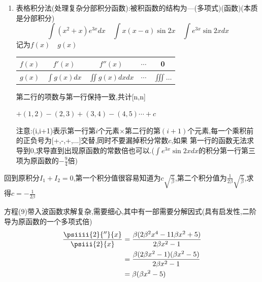 \begin{formal}
\begin{enumerate}
\begin{proof}
                \end{proof}

            \item 表格积分法(处理复杂分部积分函数):被积函数的结构为---(多项式)(函数)\quad(本质是分部积分)
                $$ \int(x^{2}+x) e^{3x} dx \quad \int x(x-a)\sin{2x} \quad \int e^{3x}\sin{2x}dx $$
                记为$f(x) \quad g(x)$

              
                \begin{center}

                    \begin{tabular}{|c|c|c|c|c|}
                        
                        \hline
                        $f(x)$ & $f'(x)$        & $f''(x)$          & $\cdots$ & 0 \\
                        \hline
                        $g(x)$ & $\int g(x) dx$ & $\iint g(x) dxdx$ & $\cdots$ & $\iiint \dots$ \\
                        \hline
                        
                    \end{tabular}
                    
                \end{center}
                
                第二行的项数与第一行保持一致,共计[n,n]

                $+(1,2)-(2,3)+(3,4)-(4,5)\cdots + c$ \quad 
                
                注意:(i,i+1)表示第一行第$i$个元素$\times$第二行的第$(i+1)$个元素,每一个乘积前的正负号为[+,-,+,...]交替,同时不要漏掉积分常数$c$,如果
                第一行的函数无法求导到0,求导直到出现原函数的常数倍也可以.($\int e^{3x}\sin{2x}dx $的积分第一行第三项为原函数的$-\frac{9}{4}$倍)
            \end{enumerate}   
        \end{formal}

        回到原积分$I_{1}+I_{2}=0$,第一个积分值很容易知道为$c \sqrt{\frac{\pi}{\beta}}$,第二个积分值为$\frac{1}{2\beta} \sqrt{\frac{\pi}{\beta}}$,求得$ c = -\frac{1}{2\beta}$

        方程(9)带入波函数求解复杂,需要细心,其中有一部需要分解因式(具有启发性,二阶导为原函数的一个多项式倍)
        \begin{align*}
            \frac{\psiiii{2}{''}{x}}{\psiii{2}{x}} & = \frac{\beta (2\beta^{2} x^{4} -11\beta x^{2} +5)}{2\beta x^{2}-1} \\
                                        & = \frac{\beta (2\beta x^{2} - 1) (\beta x^{2}-5)}{2\beta x^{2}-1}   \\
                                        & = \beta(\beta x^{2}-5) 
        \end{align*}
        
